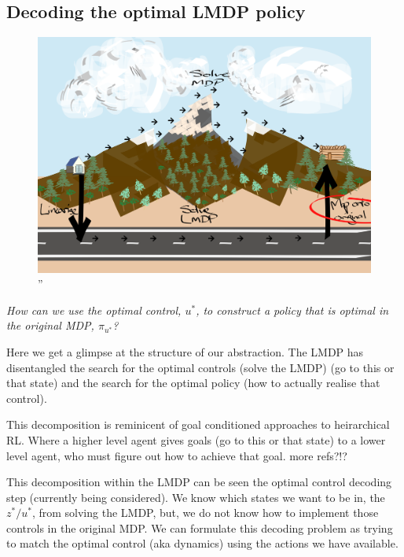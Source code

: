 
\subsection{Decoding the optimal LMDP policy}

\begin{figure}
\centering
\includegraphics[width=1\textwidth,height=0.5\textheight]{../../pictures/drawings/abstract-representations-project.png}
\caption{''}
\end{figure}

\begin{displayquote}
\textit{How can we use the optimal control, $u^{* }$, to construct a policy that is optimal in the original MDP, $\pi_{u^* }$?}
\end{displayquote}

Here we get a glimpse at the structure of our abstraction.
The LMDP has disentangled the search for the optimal controls (solve the LMDP) (go to this or
that state) and the search for the optimal policy (how to actually
realise that control).

This decomposition is reminicent of goal conditioned approaches to heirarchical RL.
Where a higher level agent gives goals (go to this or that state) to a lower level
agent, who must figure out how to achieve that goal. \cite{Vezhnevets2017} {\color{red}more refs?!?}

This decomposition within the LMDP can be seen the optimal control decoding
step (currently being considered). We know which
states we want to be in, the $z^{* } / u^{* }$, from solving the LMDP, but,
we do not know how to implement those controls in the original MDP.
We can formulate this decoding problem as trying to match the optimal control (aka dynamics)
using the actions we have available.

